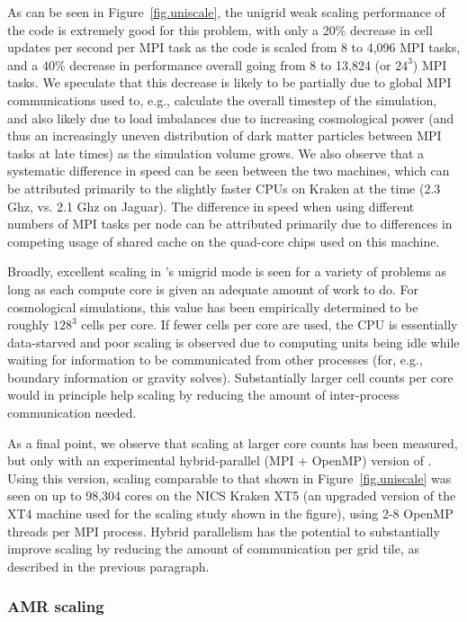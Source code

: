 As can be seen in Figure~\ref{fig.uniscale}, the unigrid weak scaling
performance of the code is extremely good for this problem, with only
a 20\% decrease in cell updates per second per MPI task as the code is
scaled from 8 to 4,096 MPI tasks, and a 40\% decrease in performance
overall going from 8 to 13,824 (or $24^3$) MPI tasks.  We speculate
that this decrease is likely to be partially due to global MPI
communications used to, e.g., calculate the overall timestep of the
simulation, and also likely due to load imbalances due to increasing
cosmological power (and thus an increasingly uneven distribution of
dark matter particles between MPI tasks at late times) as the
simulation volume grows.  We also observe that a systematic difference
in speed can be seen between the two machines, which can be attributed
primarily to the slightly faster CPUs on Kraken at the time (2.3 Ghz,
vs. 2.1 Ghz on Jaguar).  The difference in speed when using different
numbers of MPI tasks per node can be attributed primarily due to
differences in competing usage of shared cache on the quad-core chips
used on this machine.

Broadly, excellent scaling in \enzo's unigrid mode is seen for a
variety of problems as long as each compute core is given an adequate
amount of work to do.  For cosmological simulations, this value has
been empirically determined to be roughly $128^3$ cells per core.  If
fewer cells per core are used, the CPU is essentially data-starved and
poor scaling is observed due to computing units being idle while
waiting for information to be communicated from other processes (for,
e.g., boundary information or gravity solves).  Substantially larger
cell counts per core would in principle help scaling by reducing the
amount of inter-process communication needed.

As a final point, we observe that scaling at larger core counts has
been measured, but only with an experimental hybrid-parallel (MPI +
OpenMP) version of \enzo.  Using this version, scaling comparable to
that shown in Figure~\ref{fig.uniscale} was seen on up to 98,304 cores
on the NICS Kraken XT5 (an upgraded version of the XT4 machine used
for the scaling study shown in the figure), using 2-8 OpenMP threads
per MPI process.  Hybrid parallelism has the potential to
substantially improve scaling by reducing the amount of communication
per grid tile, as described in the previous paragraph.

\subsubsection{AMR scaling}

